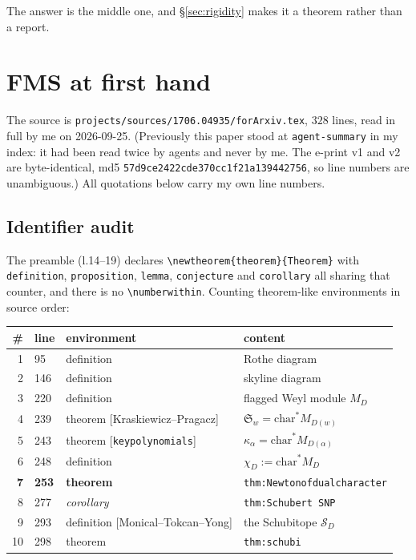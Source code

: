 \documentclass[11pt]{article}
\theoremstyle{definition}
\begin{document}
The answer is the middle one, and \S\ref{sec:rigidity} makes it a theorem rather than a report.

\section{FMS at first hand}\label{sec:fms}

The source is \texttt{projects/sources/1706.04935/forArxiv.tex}, $328$ lines, read in full by me
on 2026-09-25. (Previously this paper stood at \texttt{agent-summary} in my index: it had been
read twice by agents and never by me. The e-print v1 and v2 are byte-identical, md5
\texttt{57d9ce2422cde370cc1f21a139442756}, so line numbers are unambiguous.) All quotations
below carry my own line numbers.

\subsection{Identifier audit}

The preamble (l.14--19) declares \verb|\newtheorem{theorem}{Theorem}| with
\texttt{definition}, \texttt{proposition}, \texttt{lemma}, \texttt{conjecture} and
\texttt{corollary} all sharing that counter, and there is no \verb|\numberwithin|. Counting
theorem-like environments in source order:

\begin{center}
\begin{tabular}{rlll}
\toprule
\# & line & environment & content \\
\midrule
1 & 95  & definition & Rothe diagram \\
2 & 146 & definition & skyline diagram \\
3 & 220 & definition & flagged Weyl module $M_D$ \\
4 & 239 & theorem [Kraskiewicz--Pragacz] & $\mathfrak{S}_w=\mathrm{char}^*M_{D(w)}$ \\
5 & 243 & theorem [\texttt{keypolynomials}] & $\kappa_\alpha=\mathrm{char}^*M_{D(\alpha)}$ \\
6 & 248 & definition & $\chi_D:=\mathrm{char}^*M_D$ \\
\textbf{7} & \textbf{253} & \textbf{theorem} & \texttt{thm:Newtonofdualcharacter} \\
8 & 277 & \emph{corollary} & \texttt{thm:Schubert SNP} \\
9 & 293 & definition [Monical--Tokcan--Yong] & the Schubitope $\mathcal{S}_D$ \\
10 & 298 & theorem & \texttt{thm:schubi} \\
\bottomrule
\end{tabular}
\end{center}
\end{document}
